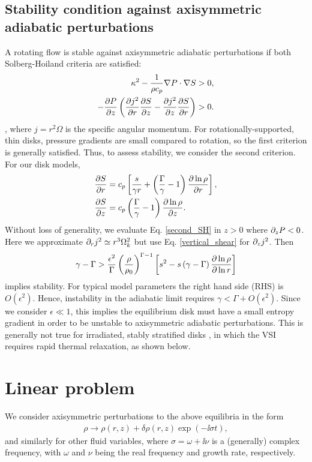 \subsection{Stability condition against axisymmetric adiabatic
  perturbations}\label{solberg}
A rotating flow is stable against axisymmetric adiabatic perturbations
if both Solberg-Hoiland criteria  are satisfied:
\begin{align}
  \kappa^2 - \frac{1}{\rho c_p}\nabla P \cdot \nabla S &> 0,\\
  -\frac{\partial P}{\partial z}\left(\frac{\partial j^2}{\partial r}\frac{\partial S}{ \partial z} -
    \frac{\partial j^2}{\partial z}\frac{\partial S}{\partial r} \right)&>0. \label{second_SH} 
\end{align}
\citep{tassoul78}, where $j=r^2\Omega$ is the specific angular
momentum. For rotationally-supported, thin disks, pressure gradients are small 
compared to rotation, so the first criterion is generally
satisfied. Thus, to assess stability, we consider the second
criterion. For our disk models,
\begin{align}
  &\frac{\partial S}{\partial r} = c_p\left[\frac{s}{\gamma r} +
    \left(\frac{\Gamma}{\gamma}-1\right)\frac{\partial \ln{\rho}}{\partial
       r}\right],\\
  &\frac{\partial S}{\partial z} = c_p
  \left(\frac{\Gamma}{\gamma}-1\right)\frac{\partial \ln{\rho}}{\partial z}. 
\end{align} 
Without loss of generality, we evaluate Eq. \ref{second_SH} in $z>0$
where $\partial_zP<0$. Here we approximate $\partial_r j^2\simeq r^3\Omega_k^2$ but
use Eq. \ref{vertical_shear} for $\partial_zj^2$. Then 
\begin{align}\label{solberg2}
  \gamma - \Gamma > \frac{\epsilon^2}{\Gamma}
  \left(\frac{\rho}{\rho_0}\right)^{\Gamma-1} \left[s^2
    -s\left(\gamma-\Gamma\right)\frac{\partial\ln{\rho}}{\partial\ln{r}} \right]
\end{align} 
implies stability. For typical model parameters the right hand
side (RHS) is $O(\epsilon^2)$. Hence, instability in the adiabatic limit  
requires $\gamma < \Gamma + O(\epsilon^2)$. Since we consider
$\epsilon\ll1$, this implies the equilibrium disk must have a small
entropy gradient in order to be unstable to axisymmetric adiabatic
perturbations. This is generally not true for irradiated, stably
stratified disks \citep{chiang97}, in which the VSI requires rapid
thermal relaxation, as shown below. 

\section{Linear problem}\label{linear}
We consider axisymmetric perturbations to the above equilibria in the
form 
\begin{align}
  \rho \to \rho(r, z) + \delta\rho(r,z)\exp{\left( - \ii\sigma
      t\right)},    
\end{align}
and similarly for other fluid variables, where $\sigma = \omega + \ii
\nu$ is a (generally) complex frequency, with $\omega$ and $\nu$ being
the real frequency and growth rate, respectively.

